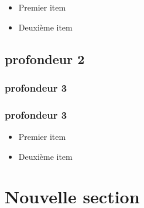 \documentclass [12 pt]{article}
\begin{document}
	\begin{itemize}
	\item Premier item
	\item Deuxième item
	\end{itemize}

\subsection{ profondeur 2}\label{sec:3.2}
	\blindtext[1]

\subsubsection { profondeur 3}\label{sec:3.2.1}
	\blindtext[1]

\subsubsection {profondeur 3}\label{sec:3.2.2}
	\begin{itemize}
	\item Premier item
	\item Deuxième item	
	\end{itemize}

\newpage
\section{Nouvelle section}\label{sec:4}
	\blindtext[2]
\end{document}
